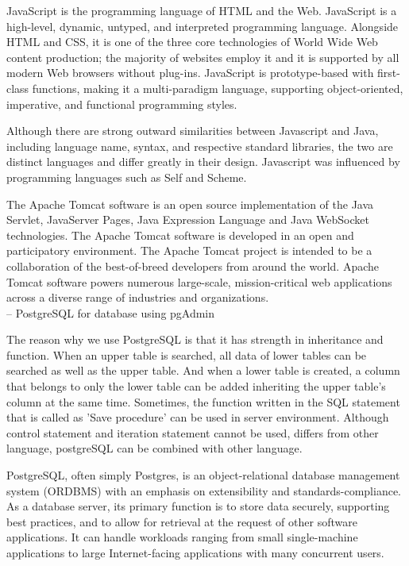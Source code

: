 \documentclass[conference]{IEEEtran}
\begin{document}
JavaScript is the programming language of HTML and the Web. JavaScript is a high-level, dynamic, untyped, and interpreted programming language. Alongside HTML and CSS, it is one of the three core technologies of World Wide Web content production; the majority of websites employ it and it is supported by all modern Web browsers without plug-ins. JavaScript is prototype-based with first-class functions, making it a multi-paradigm language, supporting object-oriented, imperative, and functional programming styles. 

Although there are strong outward similarities between Javascript and Java, including language name, syntax, and respective standard libraries, the two are distinct languages and differ greatly in their design. Javascript was influenced by programming languages such as Self and Scheme.

The Apache Tomcat software is an open source implementation of the Java Servlet, JavaServer Pages, Java Expression Language and Java WebSocket technologies. 
The Apache Tomcat software is developed in an open and participatory environment. The Apache Tomcat project is intended to be a collaboration of the best-of-breed developers from around the world. 
Apache Tomcat software powers numerous large-scale, mission-critical web applications across a diverse range of industries and organizations.\\


-- PostgreSQL for database using pgAdmin

The reason why we use PostgreSQL is that it has strength in inheritance and function. When an upper table is searched, all data of lower tables can be searched as well as the upper table. And when a lower table is created, a column that belongs to only the lower table can be added inheriting the upper table's column at the same time. Sometimes, the function written in the SQL statement that is called as 'Save procedure' can be used in server environment. Although control statement and iteration statement cannot be used, differs from other language, postgreSQL can be combined with other language.

PostgreSQL, often simply Postgres, is an object-relational database management system (ORDBMS) with an emphasis on extensibility and standards-compliance. As a database server, its primary function is to store data securely, supporting best practices, and to allow for retrieval at the request of other software applications. It can handle workloads ranging from small single-machine applications to large Internet-facing applications with many concurrent users.
\end{document}
